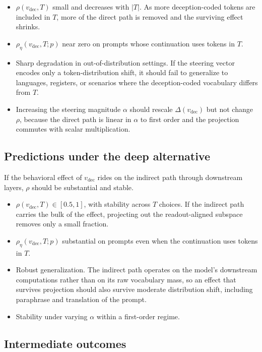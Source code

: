 \documentclass[11pt,letterpaper]{article}
\theoremstyle{plain}
\theoremstyle{definition}
\newcommand{\1}{\mathbf{1}}
\newcommand{\vdec}{v_{\text{dec}}}
\begin{document}
\begin{itemize}[leftmargin=*]
\item $\rho(\vdec, T)$ small and decreases with $|T|$. As more deception-coded tokens are included in $T$, more of the direct path is removed and the surviving effect shrinks.
\item $\rho_\eta(\vdec, T; p)$ near zero on prompts whose continuation uses tokens in $T$.
\item Sharp degradation in out-of-distribution settings. If the steering vector encodes only a token-distribution shift, it should fail to generalize to languages, registers, or scenarios where the deception-coded vocabulary differs from $T$.
\item Increasing the steering magnitude $\alpha$ should rescale $\Delta(\vdec)$ but not change $\rho$, because the direct path is linear in $\alpha$ to first order and the projection commutes with scalar multiplication.
\end{itemize}

\subsection{Predictions under the deep alternative}

If the behavioral effect of $\vdec$ rides on the indirect path through downstream layers, $\rho$ should be substantial and stable.

\begin{itemize}[leftmargin=*]
\item $\rho(\vdec, T) \in [0.5, 1]$, with stability across $T$ choices. If the indirect path carries the bulk of the effect, projecting out the readout-aligned subspace removes only a small fraction.
\item $\rho_\eta(\vdec, T; p)$ substantial on prompts even when the continuation uses tokens in $T$.
\item Robust generalization. The indirect path operates on the model's downstream computations rather than on its raw vocabulary mass, so an effect that survives projection should also survive moderate distribution shift, including paraphrase and translation of the prompt.
\item Stability under varying $\alpha$ within a first-order regime.
\end{itemize}

\subsection{Intermediate outcomes}
\end{document}
